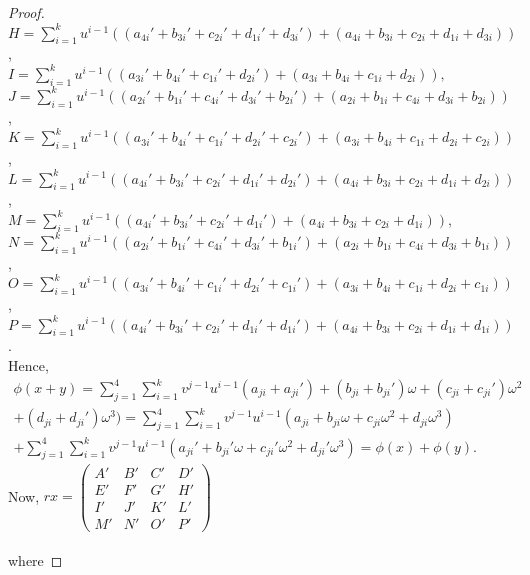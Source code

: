 \documentclass{amsart}
\theoremstyle{definition}
\theoremstyle{remark}
\numberwithin{equation}{section}
\begin{document}
\begin{proof}
$ H = \sum_{i=1}^{k}u^{i-1}((a_{4i}'+b_{3i}'+c_{2i}'+d_{1i}'+d_{3i}')+(a_{4i}+b_{3i}+c_{2i}+d_{1i}+d_{3i}))$,\\
$I = \sum_{i=1}^{k}u^{i-1}((a_{3i}'+b_{4i}'+c_{1i}'+d_{2i}')+(a_{3i}+b_{4i}+c_{1i}+d_{2i})),$\\
$J = \sum_{i=1}^{k}u^{i-1}((a_{2i}'+b_{1i}'+c_{4i}'+d_{3i}'+b_{2i}')+(a_{2i}+b_{1i}+c_{4i}+d_{3i}+b_{2i}))$,\\
$K = \sum_{i=1}^{k}u^{i-1}((a_{3i}'+b_{4i}'+c_{1i}'+d_{2i}'+c_{2i}')+(a_{3i}+b_{4i}+c_{1i}+d_{2i}+c_{2i}))$,\\
$L = \sum_{i=1}^{k}u^{i-1}((a_{4i}'+b_{3i}'+c_{2i}'+d_{1i}'+d_{2i}')+(a_{4i}+b_{3i}+c_{2i}+d_{1i}+d_{2i}))$,\\
$M = \sum_{i=1}^{k}u^{i-1}((a_{4i}'+b_{3i}'+c_{2i}'+d_{1i}')+(a_{4i}+b_{3i}+c_{2i}+d_{1i})),$\\
$ N = \sum_{i=1}^{k}u^{i-1}((a_{2i}'+b_{1i}'+c_{4i}'+d_{3i}'+b_{1i}')+(a_{2i}+b_{1i}+c_{4i}+d_{3i}+b_{1i}))$,\\
$O = \sum_{i=1}^{k}u^{i-1}((a_{3i}'+b_{4i}'+c_{1i}'+d_{2i}'+c_{1i}')+(a_{3i}+b_{4i}+c_{1i}+d_{2i}+c_{1i}))$,\\
$P = \sum_{i=1}^{k}u^{i-1}((a_{4i}'+b_{3i}'+c_{2i}'+d_{1i}'+d_{1i}')+(a_{4i}+b_{3i}+c_{2i}+d_{1i}+d_{1i}))$.\\

Hence,\begin{align*}
\phi(x+y) =  \sum_{j=1}^{4} \sum_{i=1}^{k} v^{j-1}u^{i-1}(a_{ji}+a_{ji}') +(b_{ji}+b_{ji}')\omega+(c_{ji}+c_{ji}')\omega^2 \\ + (d_{ji}+d_{ji}')\omega^3) = \sum_{j=1}^{4} \sum_{i=1}^{k} v^{j-1}u^{i-1}(a_{ji}+b_{ji}\omega+c_{ji}\omega^2+d_{ji}\omega^3) \\ +\sum_{j=1}^{4} \sum_{i=1}^{k} v^{j-1}u^{i-1}(a_{ji}'+b_{ji}'\omega+c_{ji}'\omega^2+d_{ji}'\omega^3) = \phi(x)+\phi(y).
  \end{align*}
  Now, $rx= \begin{pmatrix}
            A' & B' & C' & D' \\
            E' & F' & G' & H' \\
            I' & J' & K' & L' \\
            M' & N' & O' & P'
            \end{pmatrix}$ \\\\
    \noindent where
    

\end{proof}
\end{document}
